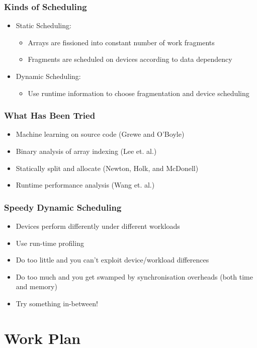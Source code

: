 \documentclass{beamer}
\begin{document}
\begin{frame}
\frametitle{Kinds of Scheduling}
\begin{itemize}
  \item Static Scheduling: 
    \begin{itemize}
      \item Arrays are fissioned into constant number of work fragments
      \item Fragments are scheduled on devices according to data dependency
    \end{itemize}
  \item Dynamic Scheduling:
    \begin{itemize}
      \item Use runtime information to choose fragmentation and device scheduling
    \end{itemize}
\end{itemize}
\end{frame}

\begin{frame}
\frametitle{What Has Been Tried}
\begin{itemize}
  \item Machine learning on source code (Grewe and O'Boyle)
  \item Binary analysis of array indexing (Lee et. al.)
  \item Statically split and allocate (Newton, Holk, and McDonell)
  \item Runtime performance analysis (Wang et. al.)
\end{itemize}
\end{frame}

\begin{frame}
\frametitle{Speedy Dynamic Scheduling}
\begin{itemize}
  \item Devices perform differently under different workloads
  \item Use run-time profiling
  \item Do too little and you can't exploit device/workload differences
  \item Do too much and you get swamped by synchronisation overheads (both time and memory)
  \item Try something in-between!
\end{itemize}
\end{frame}

\section{Work Plan}
\end{document}
